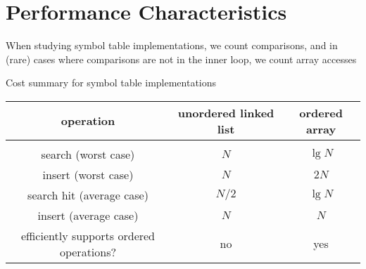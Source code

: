 \documentclass[8pt,a4paper,compress]{beamer}
\begin{document}
\section{Performance Characteristics}
\begin{frame}[fragile]
When studying symbol table implementations, we count comparisons, and in (rare) cases where comparisons are not in the inner loop, we count array accesses

\bigskip

Cost summary for symbol table implementations
\begin{center}
\begin{tabular}{ccc}
operation & unordered linked list & ordered array \\ \hline \\
search (worst case) & $N$ & $\lg N$ \\
insert (worst case) & $N$ & $2N$ \\
search hit (average case) & $N/2$ & $\lg N$ \\
insert (average case) & $N$ & $N$ \\
efficiently supports ordered operations? & no & yes
\end{tabular} 
\end{center}
\end{frame}
\end{document}
